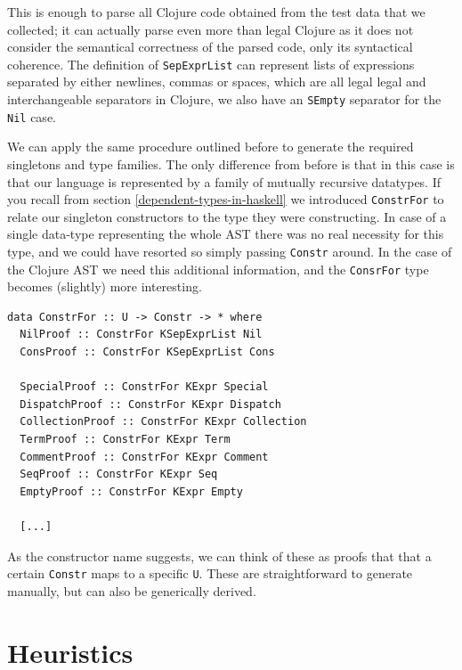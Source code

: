 \documentclass[11pt, titlepage]{article}
\newcommand{\toHaskell}[1]{\texttt{#1}\xspace}
\begin{document}
This is enough to parse all Clojure code obtained from the test data that we collected; it can actually parse even more than legal Clojure as it does not consider the semantical correctness of the parsed code, only its syntactical coherence. The definition of \toHaskell{SepExprList} can represent lists of expressions separated by either newlines, commas or spaces, which are all legal legal and interchangeable separators in Clojure, we also have an \toHaskell{SEmpty} separator for the \toHaskell{Nil} case.

We can apply the same procedure outlined before to generate the required singletons and type families. The only difference from before is that in this case is that our language is represented by a family of mutually recursive datatypes. If you recall from section \ref{dependent-types-in-haskell} we introduced \toHaskell{ConstrFor} to relate our singleton constructors to the type they were constructing. In case of a single data-type representing the whole AST there was no real necessity for this type, and we could have resorted so simply passing \toHaskell{Constr} around. In the case of the Clojure AST we need this additional information, and the \toHaskell{ConsrFor} type becomes (slightly) more interesting.

\begin{verbatim}
data ConstrFor :: U -> Constr -> * where
  NilProof :: ConstrFor KSepExprList Nil
  ConsProof :: ConstrFor KSepExprList Cons

  SpecialProof :: ConstrFor KExpr Special
  DispatchProof :: ConstrFor KExpr Dispatch
  CollectionProof :: ConstrFor KExpr Collection
  TermProof :: ConstrFor KExpr Term
  CommentProof :: ConstrFor KExpr Comment
  SeqProof :: ConstrFor KExpr Seq
  EmptyProof :: ConstrFor KExpr Empty
  
  [...]
\end{verbatim}

As the constructor name suggests, we can think of these as proofs that  that a certain \toHaskell{Constr} maps to a specific \toHaskell{U}. These are straightforward to generate manually, but can also be generically derived.

\section{Heuristics}
\end{document}
